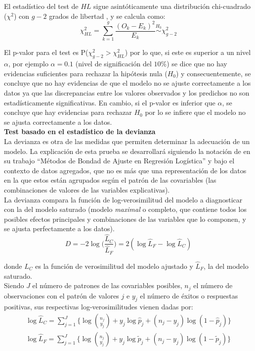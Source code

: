 El estadístico del test de $HL$ sigue asintóticamente una distribución chi-cuadrado ($\chi^2$) con $g-2$ grados de libertad \autocite{hosmer}, y se calcula como:
 \begin{equation*}
\chi^2_{HL}=\sum_{k=1}^{g}\frac{(O_k-E_k)^2}{E_k} \stackrel{H_0}{\sim} \chi^2_{g-2}
 \end{equation*}

 El p-valor para el test es P($ \chi^2_{g-2} > \chi^2_{HL}$) por lo que, si este es superior a un nivel $\alpha$, por ejemplo $\alpha=0.1$ (nivel de significación del $10\%$) se dice que no hay evidencias suficientes para rechazar la hipótesis nula ($H_0$) y consecuentemente, se concluye que no hay evidencias de que el modelo no se ajuste correctamente a los datos ya que las discrepancias entre los valores observados y los predichos no son estadísticamente significativas. En cambio, si el p-valor es inferior que $\alpha$, se concluye que hay evidencias para rechazar $H_0$ por lo se infiere que el modelo no se ajusta correctamente a los datos. \\
 
 \textbf{Test basado en el estadístico de la devianza}\\
 [0.3cm]
 La devianza es otra de las medidas que permiten determinar la adecuación de un modelo. La explicación de esta prueba se desarrollará siguiendo la notación de \textcite{tfm2} en su trabajo ``Métodos de Bondad de Ajuste en Regresión Logística'' y bajo el contexto de datos agregados, que no es más que una representación de los datos en la que estos están agrupados según el patrón de las covariables (las combinaciones de valores de las variables explicativas).\\ 
 
 La devianza compara la función de log-verosimilitud del modelo a diagnosticar con la del modelo saturado (modelo \textit{maximal} o completo, que contiene todos los posibles efectos principales y combinaciones de las variables que lo componen, y se ajusta perfectamente a los datos).
  \begin{equation}
  \label{eq:devianza}
 D= -2\log\Big(\frac{\hat{L}_C}{\hat{L}_F}\Big)= 2(\log\hat{L}_F- \log\hat{L}_C)
 \end{equation}
 
 donde $\hat{L}_C$ es la función de verosimilitud del modelo ajustado y $\hat{L}_F$, la del modelo saturado. \\
 
Siendo $J$ el número de patrones de las covariables posibles, $n_j$ el número de observaciones con el patrón de valores $j$ e $y_j$ el número de éxitos o respuestas positivas, sus respectivas log-verosimilitudes vienen dadas por:
\begin{align*}
\log\hat{L}_C=\sum_{j=1}^{J}\Big\{\log\binom{n_j}{y_j} + y_j \log \hat{p}_j + (n_j-y_j) \log (1-\hat{p}_j)\Big\}
\\
\log\hat{L}_F=\sum_{j=1}^{J}\Big\{\log\binom{n_j}{y_j}+ y_j \log \tilde{p}_j + (n_j-y_j)\log (1-\tilde{p}_j)\Big\}
\end{align*}

